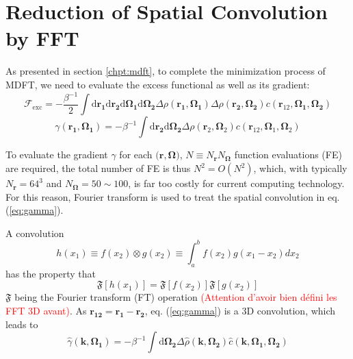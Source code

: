 
\chapter{Reduction of Spatial Convolution by FFT\label{chpt:fft-spatial}}

As presented in section \ref{chpt:mdft}, to complete the minimization
process of MDFT, we need to evaluate the excess functional as well
as its gradient:
\begin{equation}
\mathcal{F}_{\mathrm{exc}}=-\frac{\beta^{-1}}{2}\int\mathrm{d}\mathbf{r_{1}}\mathrm{d}\mathbf{r_{2}}\mathrm{d}\mathbf{\Omega_{1}}\mathrm{d}\mathbf{\Omega_{2}}\Delta\rho(\mathbf{r_{1}},\mathbf{\Omega_{1}})\Delta\rho(\mathbf{r_{2}},\mathbf{\Omega_{2}})c(\mathbf{r}_{12},\mathbf{\Omega_{1}},\mathbf{\Omega_{2}})\label{eq:fexc}
\end{equation}
\begin{equation}
\gamma(\mathbf{r_{1}},\mathbf{\Omega_{1}})=-\beta^{-1}\int\mathrm{d}\mathbf{r_{2}}\mathrm{d}\mathbf{\Omega_{2}}\Delta\rho(\mathbf{r}_{2},\mathbf{\Omega}_{2})c(\mathbf{r}_{12},\mathbf{\Omega}_{1},\mathbf{\Omega}_{2})\label{eq:gamma}
\end{equation}

To evaluate the gradient $\gamma$ for each $\mathbf{(r},\mathbf{\Omega})$,
$N\equiv N_{\mathbf{r}}N_{\mathbf{\Omega}}$ function evaluations
(FE) are required, the total number of FE is thus $N^{2}=O(N^{2})$,
which, with typically $N_{\mathbf{r}}=64^{3}$ and $N_{\mathbf{\Omega}}=50\sim100$,
is far too costly for current computing technology. For this reason,
Fourier transform is used to treat the spatial convolution in eq.
(\ref{eq:gamma}).

A convolution
\begin{equation}
h(x_{1})\equiv f(x_{2})\otimes g(x_{2})\equiv\int_{a}^{b}f(x_{2})g(x_{1}-x_{2})dx_{2}\label{eq:convolution-1}
\end{equation}
has the property that
\begin{equation}
\mathfrak{F}[h(x_{1})]=\mathfrak{F}[f(x_{2})]\mathfrak{F}[g(x_{2})]\label{eq:convolution-2}
\end{equation}
$\mathfrak{F}$ being the Fourier transform (FT) operation \textcolor{red}{(Attention
d'avoir bien défini les FFT 3D avant)}. As $\mathbf{r_{12}}=\mathbf{r_{1}}-\mathbf{r_{2}}$,
eq. (\ref{eq:gamma}) is a 3D convolution, which leads to 
\begin{equation}
\hat{\gamma}(\mathbf{k},\mathbf{\Omega_{1}})=-\beta^{-1}\int\mathrm{d}\mathbf{\Omega_{2}}\Delta\hat{\rho}(\mathbf{k},\mathbf{\Omega_{2}})\hat{c}(\mathbf{k},\mathbf{\Omega_{1}},\mathbf{\Omega_{2}})\label{eq:gamma-k}
\end{equation}

